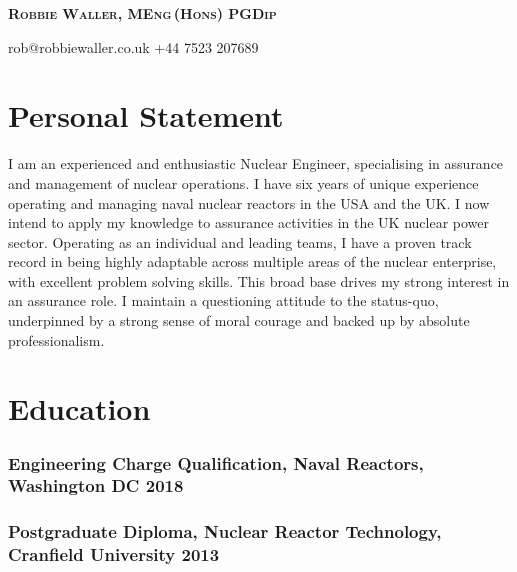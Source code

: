 \documentclass[a4paper, oneside, final, 11pt]{scrartcl} %
\begin{document}


{\fontsize{21}{21}\bfseries\scshape{Robbie Waller, MEng\,(Hons) PGDip}} %

\bigskip

\faEnvelopeO \space rob@robbiewaller.co.uk \hfill  \faMobile \space +44 7523 207689

\smallskip

\section{Personal Statement}

I am an experienced and enthusiastic Nuclear Engineer, specialising in assurance and management of nuclear operations. I have six years of unique experience operating and managing naval nuclear reactors in the USA and the UK. I now intend to apply my knowledge to assurance activities in the UK nuclear power sector. Operating as an individual and leading teams, I have a proven track record in being highly adaptable across multiple areas of the nuclear enterprise, with excellent problem solving skills. This broad base drives my strong interest in an assurance role. I maintain a questioning attitude to the status-quo, underpinned by a strong sense of moral courage and backed up by absolute professionalism. 


\section{Education}

\subsubsection*{Engineering Charge Qualification,\textnormal{ Naval Reactors, Washington DC} \hfill 2018} 
\subsubsection*{Postgraduate Diploma, \textnormal{Nuclear Reactor Technology, Cranfield University} \hfill 2013}  
\end{document}
